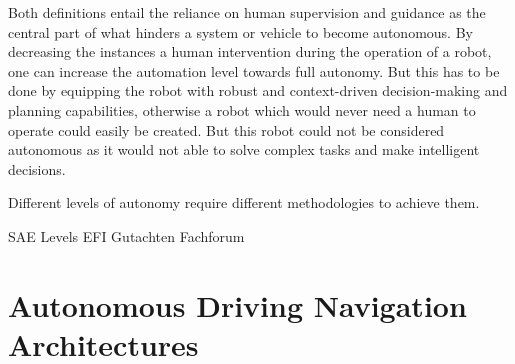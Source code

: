 Both definitions entail the reliance on human supervision and guidance as the central part of what hinders a system or vehicle to become autonomous. By decreasing the instances a human intervention during the operation of a robot, one can increase the automation level towards full autonomy. But this has to be done by equipping the robot with robust and context-driven decision-making and planning capabilities, otherwise a robot which would never need a human to operate could easily be created. But this robot could not be considered autonomous as it would not able to solve complex tasks and make intelligent decisions.

Different levels of autonomy require different methodologies to achieve them. 



SAE Levels
EFI Gutachten
Fachforum 

\section{Autonomous Driving Navigation Architectures}

